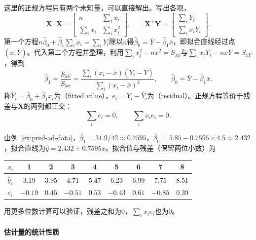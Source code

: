 这里的正规方程只有两个未知量，可以直接解出。写出各项，
\[
 \bm X^\top\bm X=\begin{bmatrix}n&\sum_ix_i\\\sum_ix_i&\sum_ix_i^2\end{bmatrix},\qquad
 \bm X^\top\bm Y=\begin{bmatrix}\sum_iY_i\\\sum_ix_iY_i\end{bmatrix}.
\]
第一个方程$n\hat\beta_0+\hat\beta_1\sum_ix_i=\sum_iY_i$除以$n$得$\hat\beta_0=\bar Y-\hat\beta_1\bar x$，即拟合直线经过点$(\bar x,\bar Y)$。代入第二个方程并整理，利用$\sum_ix_i^2-n\bar x^2=S_{xx}$与$\sum_ix_iY_i-n\bar x\bar Y=S_{xY}$，得到
\begin{equation}
 \hat\beta_1=\frac{S_{xY}}{S_{xx}}=\frac{\sum_i(x_i-\bar x)(Y_i-\bar Y)}{\sum_i(x_i-\bar x)^2},\qquad
 \hat\beta_0=\bar Y-\hat\beta_1\bar x.
 \label{eq:pred-ls-coefficients}
\end{equation}
称$\hat Y_i=\hat\beta_0+\hat\beta_1x_i$为（fitted value），$e_i=Y_i-\hat Y_i$为（residual）。正规方程等价于残差与$\bm X$的两列都正交：
\begin{equation}
 \sum_ie_i=0,\qquad\sum_ix_ie_i=0.
 \label{eq:pred-residual-orthogonality}
\end{equation}

\begin{example}[广告数据的系数估计]
\label{ex:pred-ad-fit}
由例~\ref{ex:pred-ad-data}，$\hat\beta_1=31.9/42\approx0.7595$，$\hat\beta_0=5.85-0.7595\times4.5\approx2.432$，拟合直线为$\hat y=2.432+0.7595x$。拟合值与残差（保留两位小数）为
\begin{center}
\begin{tabular}{lcccccccc}
  \toprule
  $x_i$ & 1 & 2 & 3 & 4 & 5 & 6 & 7 & 8\\
  \midrule
  $\hat y_i$ & 3.19 & 3.95 & 4.71 & 5.47 & 6.23 & 6.99 & 7.75 & 8.51\\
  $e_i$ & $-0.19$ & $0.45$ & $-0.51$ & $0.53$ & $-0.43$ & $0.61$ & $-0.85$ & $0.39$\\
  \bottomrule
\end{tabular}
\end{center}
用更多位数计算可以验证，残差之和为$0$，$\sum_ix_ie_i$也为$0$。
\end{example}

\paragraph{估计量的统计性质}

